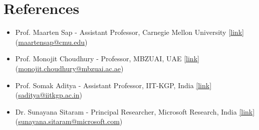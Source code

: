 \documentclass[11pt,letterpaper]{article}
\begin{document}
    \section*{References}
    \begin{itemize}[leftmargin=*,label={},itemsep=4pt]
        \item 
                 Prof. Maarten Sap - Assistant
                Professor, Carnegie Mellon University  \href{https://maartensap.com}{[link]}
             (\href{mailto:maartensap@cmu.edu}{maartensap@cmu.edu})\
        \item 
                 Prof. Monojit
                Choudhury - Professor, MBZUAI, UAE  \href{https://mbzuai.ac.ae/study/faculty/monojit-choudhury/}{[link]}
             (\href{mailto:monojit.choudhury@mbzuai.ac.ae}{monojit.choudhury@mbzuai.ac.ae})\
        \item 
                 Prof. Somak Aditya - Assistant
                Professor, IIT-KGP, India  \href{https://adityasomak.github.io/}{[link]}
             (\href{mailto:saditya@iitkgp.ac.in}{saditya@iitkgp.ac.in})\
        \item 
                 Dr. Sunayana Sitaram
                - Principal Researcher, Microsoft Research, India  \href{https://www.microsoft.com/en-us/research/people/susitara/}{[link]}
             (\href{mailto:sunayana.sitaram@microsoft.com}{sunayana.sitaram@microsoft.com})\
    \end{itemize}
    
    
\end{document}
